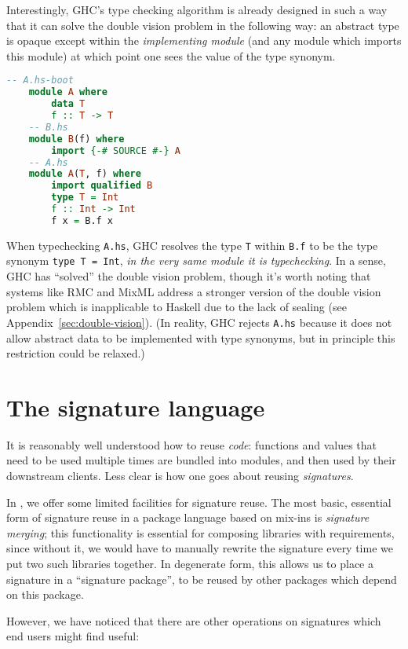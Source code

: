Interestingly, GHC's type checking algorithm is already designed in
such a way that it can solve the double vision problem in the following
way: an abstract type is opaque except within the \emph{implementing
module} (and any module which imports this module) at which point one
sees the value of the type synonym.

\begin{lstlisting}[language=Haskell]
    -- A.hs-boot
    module A where
        data T
        f :: T -> T
    -- B.hs
    module B(f) where
        import {-# SOURCE #-} A
    -- A.hs
    module A(T, f) where
        import qualified B
        type T = Int
        f :: Int -> Int
        f x = B.f x
\end{lstlisting}
%
When typechecking \verb|A.hs|, GHC resolves the type \verb|T| within
\verb|B.f| to be the type synonym \verb|type T = Int|, \emph{in the very
same module it is typechecking}.  In a sense, GHC has ``solved'' the
double vision problem, though it's worth noting that systems like RMC
and MixML address a stronger version of the double vision problem which
is inapplicable to Haskell due to the lack of sealing (see
Appendix~\ref{sec:double-vision}).  (In reality, GHC rejects \verb|A.hs|
because it does not allow abstract data to be implemented with type
synonyms, but in principle this restriction could be relaxed.)

\section{The signature language}

It is reasonably well understood how to reuse \emph{code}: functions and
values that need to be used multiple times are bundled into modules, and then
used by their downstream clients.  Less clear is how one goes about
reusing \emph{signatures}.

In \Backpack{}, we offer some limited facilities for signature reuse.
The most basic, essential form of signature reuse in a package language
based on mix-ins is \emph{signature merging}; this functionality is
essential for composing libraries with requirements, since without it,
we would have to manually rewrite the signature every time we put two
such libraries together.  In degenerate form, this allows us to place a
signature in a ``signature package'', to be reused by other packages
which depend on this package.

However, we have noticed that there are other operations on signatures
which end users might find useful:

